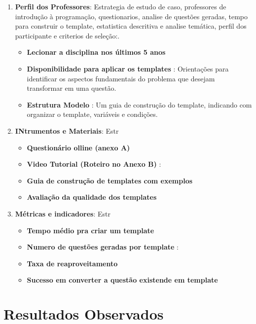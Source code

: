 \begin{enumerate}
    \item \textbf{Perfil dos Professores}:  Estrategia de estudo de caso, professores de introdução à programação, questionarios, analise de questões geradas, tempo para construir o template, estatistica descritiva e analise temática, perfil dos participante e criterios de seleção:.
    \begin{itemize}
        \item \textbf{Lecionar a disciplina nos últimos 5 anos} 
        \item \textbf{Disponibilidade para aplicar os templates} : Orientações para identificar os aspectos fundamentais do problema que desejam transformar em uma questão.
        \item \textbf{Estrutura Modelo} : Um guia de construção do template, indicando com organizar o template, variáveis e condições.
    \end{itemize}



    \item \textbf{INtrumentos e Materiais}:  Estr
    \begin{itemize}
        \item \textbf{Questionário olline (anexo A)} 
        \item \textbf{Video Tutorial (Roteiro no Anexo B)} :
        \item \textbf{Guia de construção de templates com exemplos} 
        \item  \textbf{Avaliação da qualidade dos templates} 
    \end{itemize}


    
    \item \textbf{Métricas e indicadores}:  Estr
    \begin{itemize}
        \item \textbf{Tempo médio pra criar um template} 
        \item \textbf{Numero de questões geradas por template} :
        \item \textbf{Taxa de reaproveitamento} 
        \item  \textbf{Sucesso em converter a questão existende em template} 
    \end{itemize}

    
\end{enumerate}






\section{Resultados Observados}

